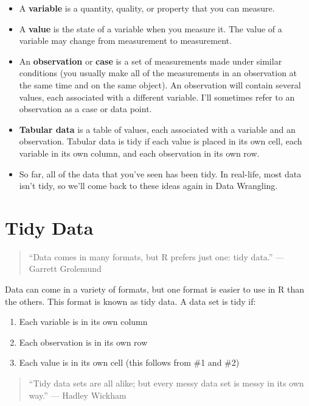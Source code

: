 \documentclass[
  xelatex, ja=standard]{bxjsbook}
\providecommand{\tightlist}{%
  \setlength{\itemsep}{0pt}\setlength{\parskip}{0pt}}
\theoremstyle{definition}
\theoremstyle{definition}
\theoremstyle{definition}
\theoremstyle{definition}
\theoremstyle{remark}
\begin{document}
\begin{itemize}
\tightlist
\item
  A \textbf{variable} is a quantity, quality, or property that you can measure.
\item
  A \textbf{value} is the state of a variable when you measure it. The value of a variable may change from measurement to measurement.
\item
  An \textbf{observation} or \textbf{case} is a set of measurements made under similar conditions (you usually make all of the measurements in an observation at the same time and on the same object). An observation will contain several values, each associated with a different variable. I'll sometimes refer to an observation as a case or data point.
\item
  \textbf{Tabular data} is a table of values, each associated with a variable and an observation. Tabular data is tidy if each value is placed in its own cell, each variable in its own column, and each observation in its own row.
\item
  So far, all of the data that you've seen has been tidy. In real-life, most data isn't tidy, so we'll come back to these ideas again in Data Wrangling.
\end{itemize}

\hypertarget{tidy-data}{%
\section{Tidy Data}\label{tidy-data}}

\begin{quote}
``Data comes in many formats, but R prefers just one: tidy data.'' --- Garrett Grolemund
\end{quote}

Data can come in a variety of formats, but one format is easier to use in R than the others. This format is known as tidy data. A data set is tidy if:

\begin{enumerate}
\def\labelenumi{\arabic{enumi}.}
\tightlist
\item
  Each variable is in its own column
\item
  Each observation is in its own row
\item
  Each value is in its own cell (this follows from \#1 and \#2)
\end{enumerate}

\begin{quote}
``Tidy data sets are all alike; but every messy data set is messy in its own way.'' --- Hadley Wickham
\end{quote}
\end{document}
